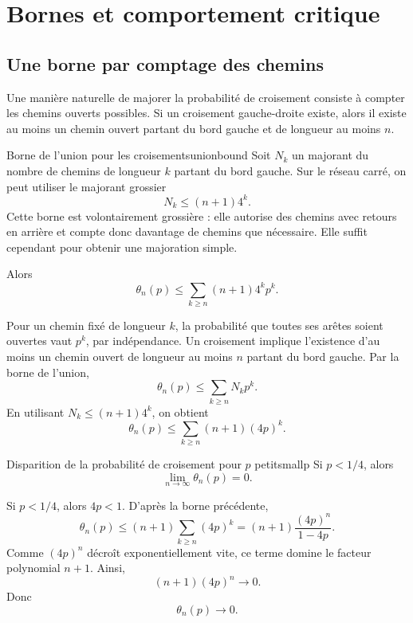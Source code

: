 \documentclass[11pt,a4paper]{report}
\newenvironment{proofbox}
{\begin{tcolorbox}[colback=grisclair,colframe=black!25,title=\textbf{Démonstration},fonttitle=\bfseries,sharp corners,boxrule=0.6pt]}
{\end{tcolorbox}}
\begin{document}
\chapter{Bornes et comportement critique}

\section{Une borne par comptage des chemins}

Une manière naturelle de majorer la probabilité de croisement consiste à compter les chemins ouverts possibles. Si un croisement gauche-droite existe, alors il existe au moins un chemin ouvert partant du bord gauche et de longueur au moins $n$.

\begin{propositionbox}{Borne de l'union pour les croisements}{unionbound}
Soit $N_k$ un majorant du nombre de chemins de longueur $k$ partant du bord gauche. Sur le réseau carré, on peut utiliser le majorant grossier
\[
N_k\leq (n+1)4^k.
\]
Cette borne est volontairement grossière : elle autorise des chemins avec retours en arrière et compte donc davantage de chemins que nécessaire. Elle suffit cependant pour obtenir une majoration simple.

Alors
\[
\theta_n(p)
\leq
\sum_{k\geq n}(n+1)4^k p^k.
\]
\end{propositionbox}

\begin{proofbox}
Pour un chemin fixé de longueur $k$, la probabilité que toutes ses arêtes soient ouvertes vaut $p^k$, par indépendance. Un croisement implique l'existence d'au moins un chemin ouvert de longueur au moins $n$ partant du bord gauche. Par la borne de l'union,
\[
\theta_n(p)
\leq
\sum_{k\geq n}N_kp^k.
\]
En utilisant $N_k\leq (n+1)4^k$, on obtient
\[
\theta_n(p)
\leq
\sum_{k\geq n}(n+1)(4p)^k.
\]
\end{proofbox}

\begin{theorembox}{Disparition de la probabilité de croisement pour $p$ petit}{smallp}
Si $p<1/4$, alors
\[
\lim_{n\to\infty}\theta_n(p)=0.
\]
\end{theorembox}

\begin{proofbox}
Si $p<1/4$, alors $4p<1$. D'après la borne précédente,
\[
\theta_n(p)
\leq
(n+1)\sum_{k\geq n}(4p)^k
=
(n+1)\frac{(4p)^n}{1-4p}.
\]
Comme $(4p)^n$ décroît exponentiellement vite, ce terme domine le facteur polynomial $n+1$. Ainsi,
\[
(n+1)(4p)^n\longrightarrow 0.
\]
Donc
\[
\theta_n(p)\longrightarrow 0.
\]
\end{proofbox}
\end{document}
